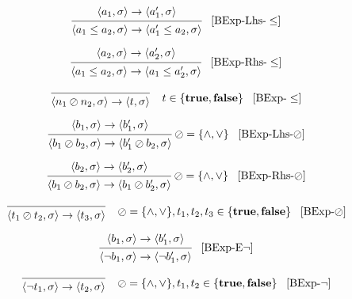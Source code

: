 \[
\begin{prooftree}
\hypo{
	\langle a_1, \sigma \rangle \rightarrow
	\langle a_1^\prime, \sigma \rangle 
} 
\infer1{
	\langle a_1 \leq a_2, \sigma \rangle \rightarrow  
	\langle a_1^\prime \leq a_2, \sigma \rangle
}
\end{prooftree} \; \; \; [\text{BExp-Lhs-}\leq]
\]

\[
\begin{prooftree}
\hypo{
	\langle a_2, \sigma \rangle \rightarrow
	\langle a_2^\prime, \sigma \rangle 
} 
\infer1{
	\langle a_1 \leq a_2, \sigma \rangle \rightarrow  
	\langle a_1 \leq a_2^\prime, \sigma \rangle
}
\end{prooftree} \; \; \; [\text{BExp-Rhs-}\leq]
\]

\[
\begin{prooftree}
\infer0{
	\langle n_1 \oslash n_2, \sigma \rangle \rightarrow  
	\langle t, \sigma \rangle
}
\end{prooftree} \; \; \; \; t \in \{ \textbf{true}, \textbf{false} \} \; \; \; [\text{BExp-}\leq]
\]

\[
\begin{prooftree}
\hypo{
	\langle b_1, \sigma \rangle \rightarrow
	\langle b_1^\prime, \sigma \rangle 
} 
\infer1{
	\langle b_1 \oslash b_2, \sigma \rangle \rightarrow  
	\langle b_1^\prime \oslash b_2, \sigma \rangle
}
\end{prooftree} \; \oslash = \{\land,\lor\} \; \; \; [\text{BExp-Lhs-}\oslash]
\]

\[
\begin{prooftree}
\hypo{
	\langle b_2, \sigma \rangle \rightarrow
	\langle b_2^\prime, \sigma \rangle 
} 
\infer1{
	\langle b_1 \oslash b_2, \sigma \rangle \rightarrow  
	\langle b_1 \oslash b_2^\prime, \sigma \rangle
}
\end{prooftree} \; \oslash = \{\land,\lor\} \; \; \; [\text{BExp-Rhs-}\oslash]
\]

\[
\begin{prooftree}
\infer0{
	\langle t_1 \oslash t_2, \sigma \rangle \rightarrow  
	\langle t_3,  \sigma \rangle
}
\end{prooftree} \; \; \; \; \oslash = \{\land,\lor\}, t_1, t_2, t_3 \in \{ \textbf{true}, \textbf{false} \}  \; \; \; [\text{BExp-}\oslash]
\]

\[
\begin{prooftree}
\hypo{
	\langle b_1, \sigma \rangle \rightarrow  
	\langle b_1^\prime,  \sigma \rangle
}
\infer1{
	\langle \neg b_1, \sigma \rangle \rightarrow  
	\langle \neg b_1^\prime,  \sigma \rangle
}
\end{prooftree} \; \; \; [\text{BExp-E}\neg]
\]

\[
\begin{prooftree}
\infer0{
	\langle \neg t_1, \sigma \rangle \rightarrow  
	\langle t_2,  \sigma \rangle
}
\end{prooftree} \; \; \; \; \oslash = \{\land,\lor\}, t_1, t_2 \in \{ \textbf{true}, \textbf{false} \}  \; \; \; [\text{BExp-}\neg]
\]


